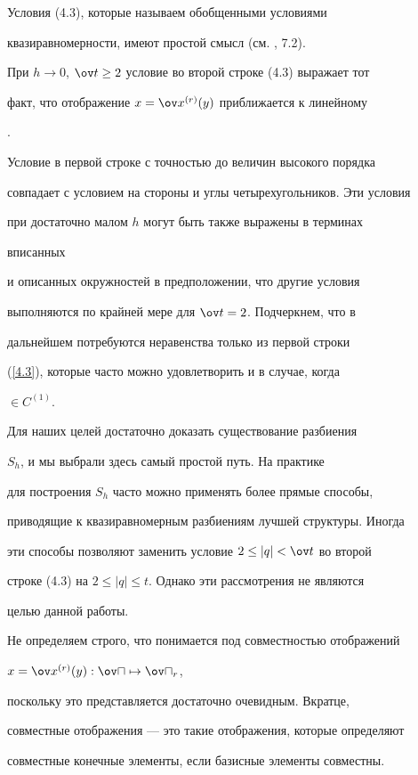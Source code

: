 \begin{notes}


Условия (4.3), которые называем обобщенными условиями


квазиравномерности, имеют простой смысл (см. \cite{korneev3}, 7.2).


При $h\to0$, $\ov t\ge2$ условие во второй строке (4.3) выражает тот


факт, что отображение $x=\ov x\r(y)$ приближается к линейному


\cite{korneev3}.


Условие в первой строке с точностью до величин высокого порядка


совпадает с условием на стороны и углы четырехугольников. Эти условия


при достаточно малом $h$ могут быть также выражены в терминах


вписанных


и описанных окружностей в предположении, что другие условия


выполняются по крайней мере для $\ov t=2$. Подчеркнем, что в


дальнейшем потребуются неравенства только из первой строки


(\ref{4.3}), которые часто можно удовлетворить и в случае, когда


\bo$\in C^{(1)}$.


\end{notes}





\begin{notes}


Для наших целей достаточно доказать существование разбиения


$S_h$, и мы выбрали здесь самый простой путь. На практике


для построения $S_h$ часто можно применять более прямые способы,


приводящие к квазиравномерным разбиениям лучшей структуры. Иногда


эти способы позволяют заменить условие $2\le|q|<\ov t$ во второй


строке (4.3) на $2\le|q|\le t$. Однако эти рассмотрения не являются


целью данной работы.


\end{notes}





\begin{notes}


Не определяем строго, что понимается под совместностью отображений


$x=\ov x\r(y):\ov\sqcap\mapsto\ov\sqcap_r$,


поскольку это представляется достаточно очевидным. Вкратце,


совместные отображения --- это такие отображения, которые определяют


совместные конечные элементы, если базисные элементы совместны.


\end{notes}






